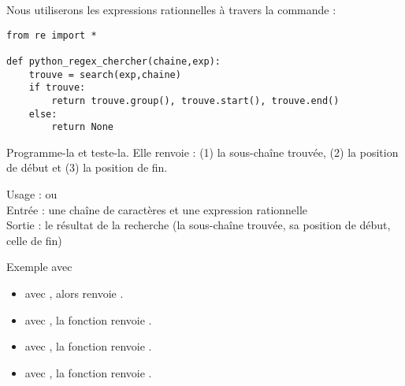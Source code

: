 \documentclass[11pt,class=report,crop=false]{standalone}
\begin{document}
\begin{cours}
 

\bigskip

Nous utiliserons les expressions rationnelles à travers la commande :\\ \centerline{} 


\begin{lstlisting}
from re import *

def python_regex_chercher(chaine,exp):
    trouve = search(exp,chaine)
    if trouve:
        return trouve.group(), trouve.start(), trouve.end()
    else:
        return None
\end{lstlisting}

Programme-la et teste-la. Elle renvoie : (1) la sous-chaîne trouvée, (2) la position de début et (3) la position de fin.

\begin{fonctionpython}
    Usage :  ou \\
    Entrée : une chaîne de caractères  et une expression rationnelle   \\
    Sortie : le résultat de la recherche (la sous-chaîne trouvée, sa position de début, celle de fin) 
  
  \medskip
     
   Exemple avec 
  \begin{itemize}  
    \item avec , alors  renvoie
    .
    \item avec , la fonction renvoie
    .
    \item avec , la fonction renvoie
    .
    
    
    \item avec , la fonction renvoie .
    

  \end{itemize} 
  \end{fonctionpython}  

\end{cours}

\end{document}
